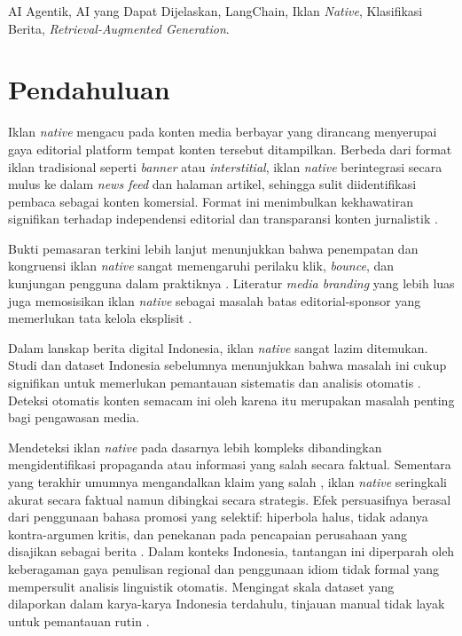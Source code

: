 \documentclass{ieeeaccess}
\begin{document}
\begin{keywords}
AI Agentik, AI yang Dapat Dijelaskan, LangChain, Iklan \textit{Native}, Klasifikasi Berita, \textit{Retrieval-Augmented Generation}.
\end{keywords}

\titlepgskip=-15pt

\maketitle

\section{Pendahuluan}
\label{sec:pendahuluan}
Iklan \textit{native} mengacu pada konten media berbayar yang dirancang menyerupai gaya editorial platform tempat konten tersebut ditampilkan. Berbeda dari format iklan tradisional seperti \textit{banner} atau \textit{interstitial}, iklan \textit{native} berintegrasi secara mulus ke dalam \textit{news feed} dan halaman artikel, sehingga sulit diidentifikasi pembaca sebagai konten komersial. Format ini menimbulkan kekhawatiran signifikan terhadap independensi editorial dan transparansi konten jurnalistik \cite{b38}.

Bukti pemasaran terkini lebih lanjut menunjukkan bahwa penempatan dan kongruensi iklan \textit{native} sangat memengaruhi perilaku klik, \textit{bounce}, dan kunjungan pengguna dalam praktiknya \cite{b53}. Literatur \textit{media branding} yang lebih luas juga memosisikan iklan \textit{native} sebagai masalah batas editorial-sponsor yang memerlukan tata kelola eksplisit \cite{b54}.

Dalam lanskap berita digital Indonesia, iklan \textit{native} sangat lazim ditemukan. Studi dan dataset Indonesia sebelumnya menunjukkan bahwa masalah ini cukup signifikan untuk memerlukan pemantauan sistematis dan analisis otomatis \cite{b17, b21}. Deteksi otomatis konten semacam ini oleh karena itu merupakan masalah penting bagi pengawasan media.

Mendeteksi iklan \textit{native} pada dasarnya lebih kompleks dibandingkan mengidentifikasi propaganda atau informasi yang salah secara faktual. Sementara yang terakhir umumnya mengandalkan klaim yang salah \cite{b8}, iklan \textit{native} seringkali akurat secara faktual namun dibingkai secara strategis. Efek persuasifnya berasal dari penggunaan bahasa promosi yang selektif: hiperbola halus, tidak adanya kontra-argumen kritis, dan penekanan pada pencapaian perusahaan yang disajikan sebagai berita \cite{b9}. Dalam konteks Indonesia, tantangan ini diperparah oleh keberagaman gaya penulisan regional dan penggunaan idiom tidak formal yang mempersulit analisis linguistik otomatis. Mengingat skala dataset yang dilaporkan dalam karya-karya Indonesia terdahulu, tinjauan manual tidak layak untuk pemantauan rutin \cite{b17, b19}.
\end{document}

